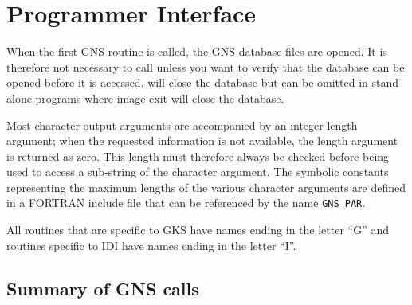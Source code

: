 \documentclass[twoside,11pt,nolof]{starlink}
\begin{document}
\clearpage
\section{Programmer Interface}\label{prog}

When the first GNS routine is called, the GNS database files are opened. It is
therefore not necessary to call
 unless you want to verify that
the database can be opened before it is accessed.
 will close
the database but can be omitted in stand alone programs where image exit will
close the database.

Most character output arguments are accompanied by an integer length argument;
when the requested information is not available, the length argument is
returned as zero. This length must therefore always be checked before being
used to access a sub-string of the character argument. The symbolic constants
representing the maximum lengths of the various character arguments are defined
in a FORTRAN include file that can be referenced by the name \texttt{GNS\_PAR}.

All routines that are specific to GKS have names ending in the letter ``G'' and
routines specific to IDI have names ending in the letter ``I''.

\subsection{Summary of GNS calls}
\end{document}
